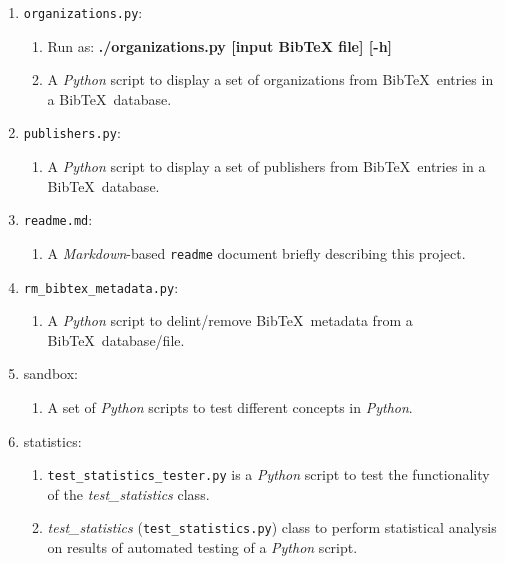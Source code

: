 \begin{enumerate}
\begin{enumerate}
	\end{enumerate}
\item {\tt organizations.py}: \vspace{-0.3cm}
	\begin{enumerate} \itemsep -2pt
	\item Run as: {\bf ./organizations.py [input BibTeX file] [-h]}
	\item A {\it Python} script to display a set of organizations from {\sc Bib}\TeX\ entries in a {\sc Bib}\TeX\ database.
	\end{enumerate}
\item {\tt publishers.py}: \vspace{-0.3cm}
	\begin{enumerate} \itemsep -2pt
	\item A {\it Python} script to display a set of publishers from {\sc Bib}\TeX\ entries in a {\sc Bib}\TeX\ database.
	\end{enumerate}
\item {\tt readme.md}: \vspace{-0.3cm}
	\begin{enumerate} \itemsep -2pt
	\item A {\it Markdown}-based {\tt readme} document briefly describing this project.
	\end{enumerate}
\item {\tt rm\_bibtex\_metadata.py}: \vspace{-0.3cm}
	\begin{enumerate} \itemsep -2pt
	\item A {\it Python} script to delint/remove {\sc Bib}\TeX\ metadata from a {\sc Bib}\TeX\ database/file.
	\end{enumerate}
\item sandbox: \vspace{-0.3cm}
	\begin{enumerate} \itemsep -2pt
	\item A set of {\it Python} scripts to test different concepts in {\it Python}.
	\end{enumerate}
\item statistics: \vspace{-0.3cm}
	\begin{enumerate} \itemsep -2pt
	\item {\tt test\_statistics\_tester.py} is a {\it Python} script to test the functionality of the {\it test\_statistics} class.
	\item {\it test\_statistics} ({\tt test\_statistics.py}) class to perform statistical analysis on results of automated testing of a {\it Python} script.

\end{enumerate}
\end{enumerate}

